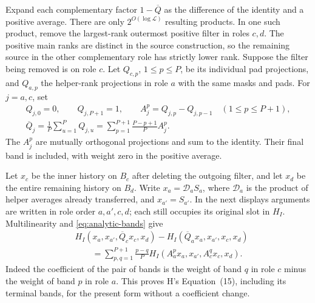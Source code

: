 Expand each complementary factor \(1-\overline Q\) as the
difference of the identity and a positive average.  There are only
\(2^{O(\log\mathcal L)}\) resulting products.  In one such product,
remove the largest-rank outermost positive filter in roles \(c,d\).
The positive main ranks are distinct in the source construction,
so the remaining source in the other complementary role has
strictly lower rank.  Suppose the filter being removed is on
role \(c\).  Let \(Q_{c,p}\), \(1\le p\le P\), be its individual
pad projections, and \(Q_{a,p}\) the helper-rank projections in
role \(a\) with the same masks and pads.  For \(j=a,c\), set
\begin{equation}
 \begin{gathered}
 Q_{j,0}=0,\qquad Q_{j,P+1}=1,\qquad
 A_j^p=Q_{j,p}-Q_{j,p-1}\quad(1\le p\le P+1),\\
 \overline Q_j=\frac1P\sum_{u=1}^P Q_{j,u}
       =\sum_{p=1}^{P+1}\frac{P-p+1}{P}A_j^p .
 \end{gathered}
 \label{eq:analytic-bands}
\end{equation}
The \(A_j^p\) are mutually orthogonal projections and sum to the
identity.  Their final band is included, with weight zero in
the positive average.

Let \(x_c\) be the inner history on \(B_c\) after deleting the
outgoing filter, and let \(x_d\) be the entire remaining history
on \(B_d\).  Write \(x_a=\mathcal D_aS_a\), where \(\mathcal D_a\)
is the product of helper averages already transferred, and
\(x_{a'}=S_{a'}\).  In the next displays arguments are written in
role order \(a,a',c,d\); each still occupies its original slot in
\(H_I\).  Multilinearity and \eqref{eq:analytic-bands} give
\begin{equation}
 \begin{split}
 &H_I(x_a,x_{a'},\overline Q_cx_c,x_d)
       -H_I(\overline Q_ax_a,x_{a'},x_c,x_d)\\
 &\qquad=\sum_{p,q=1}^{P+1}\frac{p-q}{P}
                  H_I(A_a^px_a,x_{a'},A_c^qx_c,x_d).
 \end{split}
 \label{eq:analytic-band-transfer}
\end{equation}
Indeed the coefficient of the pair of bands is the weight of
band \(q\) in role \(c\) minus the weight of band \(p\) in
role \(a\).  This proves H's Equation~(15), including its
terminal bands, for the present form without a coefficient change.

